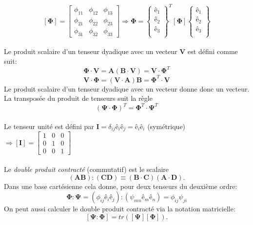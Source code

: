 $$[\mathbf{\Phi}]=\left[\begin{array}{ccc}
\phi_{11}&\phi_{12}&\phi_{13}\\
\phi_{21}&\phi_{22}&\phi_{23}\\
\phi_{31}&\phi_{32}&\phi_{33}
\end{array}\right]\Rightarrow \mathbf{\Phi}=\left\{\begin{array}{c}
\textbf{ê}_1\\
\textbf{ê}_2\\
\textbf{ê}_3\\
\end{array}\right\}^T [\mathbf{\Phi}]\left\{
\begin{array}{c}
\textbf{ê}_1\\
\textbf{ê}_2\\
\textbf{ê}_3\\
\end{array}\right\} $$
\paragraph{}
Le produit scalaire d'un tenseur dyadique avec un vecteur \textbf{V} est défini comme suit:
$$\mathbf{\Phi}\cdot\textbf{V} = \textbf{A}(\textbf{B}\cdot\textbf{V})=\textbf{V}\cdot\mathbf{\Phi}^T$$
$$\textbf{V}\cdot\mathbf{\Phi} = (\textbf{V}\cdot\textbf{A})\textbf{B}=\mathbf{\Phi}^T\cdot\textbf{V}$$
Le produit scalaire d'un tenseur dyadique avec un vecteur donne donc un vecteur. La transposée du produit de tenseurs suit la règle $$(\mathbf{\Psi}\cdot\mathbf{\Phi})^T=\mathbf{\Phi}^T\cdot\mathbf{\Psi}^T$$
\paragraph{}
Le tenseur unité est défini par $\textbf{I}=\delta_{ij}\textbf{ê}_i\textbf{ê}_j=\textbf{ê}_i\textbf{ê}_i$ (symétrique) $\Rightarrow [\textbf{I}]=\left[\begin{array}{ccc}
1&0&0\\
0&1&0 \\
0&0&1
\end{array}\right]$
\paragraph{}
Le \emph{double produit contracté} (commutatif) est le scalaire $$(\textbf{AB}):(\textbf{CD})\equiv (\textbf{B}\cdot\textbf{C})(\textbf{A}\cdot\textbf{D}).$$
Dans une base cartésienne cela donne, pour deux tenseurs du deuxième ordre:
$$\mathbf{\Phi}:\mathbf{\Psi}=(\phi_{ij}\textbf{ê}_i\textbf{ê}_j):(\psi_{mn}\textbf{ê}_m\textbf{ê}_n)=\phi_{ij}\psi_{ji}$$
On peut aussi calculer le double produit contracté via la notation matricielle:
$$[\mathbf{\Psi}:\mathbf{\Phi}]=tr([\mathbf{\Psi}][\mathbf{\Phi}]).$$

